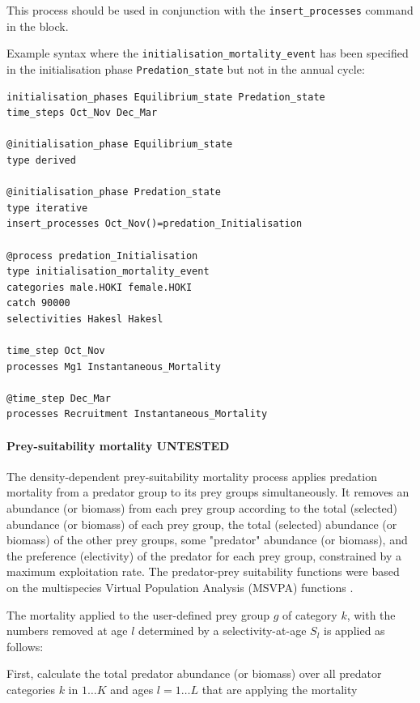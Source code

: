 This process should be used in conjunction with the \texttt{insert\_processes} command in the  block.

Example syntax where the \texttt{initialisation\_mortality\_event} has been specified in the initialisation phase \texttt{Predation\_state} but not in the annual cycle:

{\small{\begin{verbatim}
initialisation_phases Equilibrium_state Predation_state
time_steps Oct_Nov Dec_Mar

@initialisation_phase Equilibrium_state
type derived

@initialisation_phase Predation_state
type iterative
insert_processes Oct_Nov()=predation_Initialisation

@process predation_Initialisation
type initialisation_mortality_event
categories male.HOKI female.HOKI
catch 90000
selectivities Hakesl Hakesl

time_step Oct_Nov
processes Mg1 Instantaneous_Mortality

@time_step Dec_Mar
processes Recruitment Instantaneous_Mortality
\end{verbatim}}}

\paragraph{Prey-suitability mortality UNTESTED}

The density-dependent prey-suitability mortality process applies predation mortality from a predator group to its prey groups simultaneously. It removes an abundance (or biomass) from each prey group according to the total (selected) abundance (or biomass) of each prey group, the total (selected) abundance (or biomass) of the other prey groups, some "predator" abundance (or biomass), and the preference (electivity) of the predator for each prey group, constrained by a maximum exploitation rate. The predator-prey suitability functions were based on the multispecies Virtual Population Analysis (MSVPA) functions \citep{JuradoMolina2005}.

The mortality applied to the user-defined prey group $g$ of category $k$, with the numbers removed at age $l$ determined by a selectivity-at-age $S_l$ is applied as follows:

First, calculate the total predator abundance (or biomass) over all predator categories $k$ in $1 \ldots K$ and ages $l = 1 \ldots L$ that are applying the mortality

